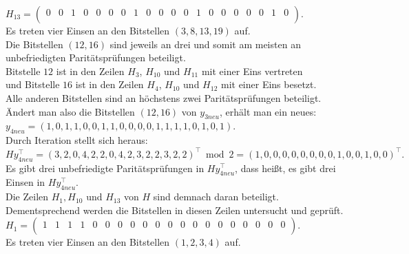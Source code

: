 \begin{Beispiel}
    $H_{13}= \left( \begin{array}{rrrrrrrrrrrrrrrrrrrr}
        0 & 0 & 1 & 0 & 0 & 0 & 0 & 1 & 0 & 0 & 0 & 0 & 1 & 0 & 0 & 0 & 0 & 0 & 1 & 0 \\
       \end{array}\right). 
    $\\
    Es treten vier Einsen an den Bitstellen $(3, 8, 13, 19)$ auf.\\
    
    Die Bitstellen $(12, 16)$ sind jeweils an drei und somit am meisten an unbefriedigten Paritätsprüfungen beteiligt.\\ 
    Bitstelle $12$ ist in den Zeilen $H_3$, $H_{10}$ und $H_{11}$ mit einer Eins vertreten\\
    und Bitstelle $16$ ist in den Zeilen $H_4$, $H_{10}$ und $H_{12}$ mit einer Eins besetzt.\\
    Alle anderen Bitstellen sind an höchstens zwei Paritätsprüfungen beteiligt.\\
     
    Ändert man also die Bitstellen $(12, 16)$ von $y_{3neu}$, erhält man ein neues:\\
    $y_{4neu} = (1,0,1,1,0,0,1,1,0,0,0,0,1,1,1,1,0,1,0,1).$\\
    
    Durch Iteration stellt sich heraus:\\
    $Hy_{4neu}^\intercal= (3,2,0,4,2,2,0,4,2,3,2,2,3,2,2)^\intercal \bmod 2= (1,0,0,0,0,0,0,0,0,1,0,0,1,0,0)^\intercal.$\\
    
    Es gibt drei unbefriedigte Paritätsprüfungen in $Hy_{4neu}^\intercal$,
    dass hei\ss{}t, es gibt drei Einsen in $Hy_{4neu}^\intercal.$\\
    Die Zeilen $H_1, H_{10}$ und $H_{13}$ von $H$ sind demnach daran beteiligt.\\ 
    Dementsprechend werden die Bitstellen in diesen Zeilen untersucht und geprüft.\\
    
    $H_1= \left( \begin{array}{rrrrrrrrrrrrrrrrrrrr}
        1 & 1 & 1 & 1 & 0 & 0 & 0 & 0 & 0 & 0 & 0 & 0 & 0 & 0 & 0 & 0 & 0 & 0 & 0 & 0 \\
       \end{array}\right). 
    $\\
    Es treten vier Einsen an den Bitstellen $(1, 2, 3, 4)$ auf.\\
    

\end{Beispiel}
